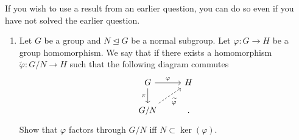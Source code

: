 \documentclass[12pt]{article}
\begin{document}
If you wish to use a result from an earlier question, you can do so even if you have not solved the earlier question.

\begin{enumerate}
	\item Let $G$ be a group and $N \unlhd G$ be a normal subgroup. Let $\varphi : G \to H$ be a group homomorphism. We say that  if there exists a homomorphism $\widetilde{\varphi} : G/N \to H$ such that the following diagram commutes
	\begin{equation} \label{eq:01}
		\begin{tikzcd}
			G \arrow[r, "\varphi"] \arrow[d, "\pi"'] & H \\
			G/N \arrow[ru, "\widetilde{\varphi}"', dashed] & .
		\end{tikzcd}
	\end{equation}
	Show that $\varphi$ factors through $G/N$ iff $N \subset \ker(\varphi)$.


\end{enumerate}
\end{document}
